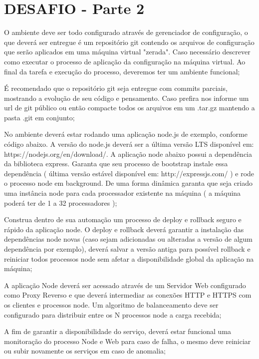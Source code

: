 \section{DESAFIO - Parte 2}

O ambiente deve ser todo configurado através de gerenciador de
configuração, o que deverá ser entregue é um repositório git contendo
os arquivos de configuração que serão aplicados em uma máquina virtual
"zerada". Caso necessário descrever como executar o processo de
aplicação da configuração na máquina virtual. Ao final da tarefa e
execução do processo, deveremos ter um ambiente funcional; 

É recomendado que o repositório git seja entregue com commits
parciais, mostrando a evolução de seu código e pensamento. Caso
prefira nos informe um url de git público ou então compacte todos os
arquivos em um .tar.gz mantendo a pasta .git em conjunto; 

No ambiente deverá estar rodando uma aplicação node.js de exemplo,
conforme código abaixo. A versão do node.js deverá ser a última versão
LTS disponível em: https://nodejs.org/en/download/. A aplicação node
abaixo possui a dependência da biblioteca express. Garanta que seu
processo de bootstrap instale essa dependência ( última versão estável
disponível em: http://expressjs.com/ ) e rode o processo node em
background. De uma forma dinâmica garanta que seja criado uma
instância node para cada processador existente na máquina ( a máquina
poderá ter de 1 a 32 processadores );

Construa dentro de sua automação um processo de deploy e rollback
seguro e rápido da aplicação node. O deploy e rollback deverá garantir
a instalação das dependências node novas (caso sejam adicionadas ou
alteradas a versão de algum dependência por exemplo), deverá salvar a
versão antiga para possível rollback e reiniciar todos processos node
sem afetar a disponibilidade global da aplicação na máquina; 

A aplicação Node deverá ser acessado através de um Servidor Web
configurado como Proxy Reverso e que deverá intermediar as conexões
HTTP e HTTPS com os clientes e processos node. Um algoritmo de
balanceamento deve ser configurado para distribuir entre os N
processos node a carga recebida; 

A fim de garantir a disponibilidade do serviço, deverá estar funcional
uma monitoração do processo Node e Web para caso de falha, o mesmo
deve reiniciar ou subir novamente os serviços em caso de anomalia; 

